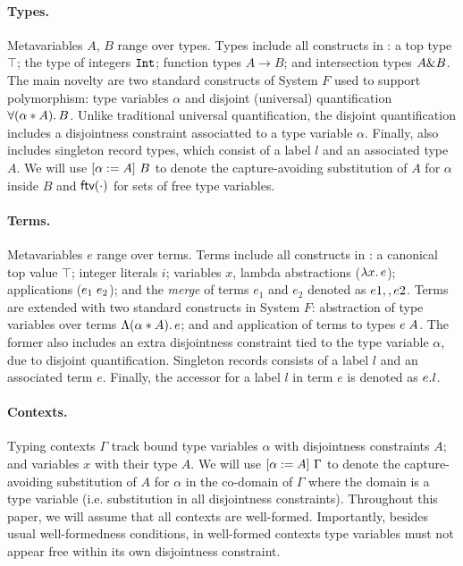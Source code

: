 
\paragraph{Types.} 
Metavariables $A$, $B$ range over types. 
Types include all constructs in \oldname: a top type $\top$; 
the type of integers $\tyint$;
function types $A \to B$; and intersection types $A \inter B$.
The main novelty are two standard constructs of System $F$ used to support
polymorphism: 
type variables $\alpha$ and disjoint (universal) quantification $\fordis \alpha A B$. 
Unlike traditional universal quantification, the disjoint
quantification includes a disjointness constraint associatted to a type variable $\alpha$.
Finally, \name also includes singleton record types, which consist of a label $l$ and
an associated type $A$.
We will use $\subst {A} \alpha {B}$
to denote the capture-avoiding substitution of $A$ for $\alpha$ inside $B$ and
$\ftv \cdot$ for sets of free type variables. 

\paragraph{Terms.} 
Metavariables $e$ range over terms.  
Terms include all constructs in \oldname: a canonical top value $\top$; integer literals $i$;
variables $x$, lambda abstractions ($\lamty x A e$); applications 
($\app {e_1} {e_2}$); and the \emph{merge} of terms $e_1$ and $e_2 $ denoted as 
$e1 \mergeop e2$.
Terms are extended with two standard constructs in System $F$:
abstraction of type variables over terms $\blamdis \alpha A e$; and
and application of terms to types $\tapp e A$. 
The former also includes an extra disjointness constraint tied to the type 
variable $\alpha$, due to disjoint quantification.
Singleton records consists of a label $l$ and an associated term $e$.
Finally, the accessor for a label $l$ in term $e$ is denoted as $\recordProj e l$.

\paragraph{Contexts.} Typing contexts $ \Gamma $ track bound type variables
$\alpha$ with disjointness constraints $A$; and variables $x$ with their type $A$. 
We will use $\subst {A} \alpha {\Gamma}$
to denote the capture-avoiding substitution of $A$ for $\alpha$ in the co-domain of
$\Gamma$ where the domain is a type variable (i.e. substitution in all disjointness constraints).
Throughout this paper, we will assume that all contexts are
well-formed. Importantly, besides usual well-formedness conditions, in
well-formed contexts type variables must not appear free within its own disjointness constraint.

